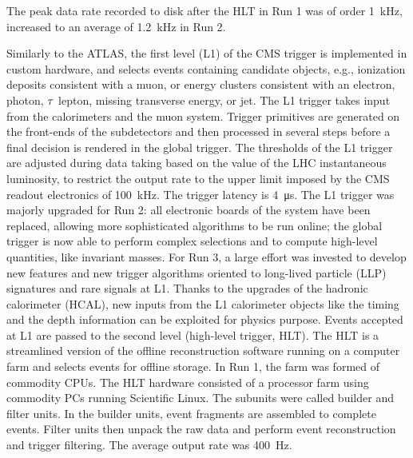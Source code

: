 The peak data rate recorded to disk after the HLT in Run 1 was of order \SI{1}{\kilo\hertz}, increased to an average of \SI{1.2}{\kilo\hertz} in Run 2.\\
\vspace{0.3 cm}

Similarly to the ATLAS, the first level (L1) of the CMS trigger is implemented in custom hardware, and selects events containing candidate objects, e.g., ionization deposits consistent with a muon, or energy clusters consistent with an electron, photon, $\rm \tau$ lepton, missing transverse energy, or jet. The L1 trigger takes input from the calorimeters and the muon system. 
Trigger primitives are generated on the front-ends of the subdetectors and then processed in several steps before a final decision is rendered in the global trigger.
The thresholds of the L1 trigger are adjusted during data taking based on the value of the LHC instantaneous luminosity, to restrict the output rate to the upper limit imposed by the CMS readout electronics of \SI{100}{\kilo\hertz}. The trigger latency is \SI{4}{\micro\second}.
The L1 trigger was majorly upgraded for Run 2: all electronic boards of the system have been replaced, allowing more sophisticated algorithms to be run online; the global trigger is now able to perform complex selections and to compute high-level quantities, like invariant masses.
For Run 3, a large effort was invested to develop new features and new trigger algorithms oriented to long-lived particle (LLP) signatures and rare signals at L1. Thanks to the upgrades of the hadronic calorimeter (HCAL), new inputs from the L1 calorimeter objects like the timing and the depth information can be exploited for physics purpose.
Events accepted at L1 are passed to the second level (high-level trigger, HLT).
The HLT is a streamlined version of the offline reconstruction software running on a computer farm and selects events for offline storage.
In Run 1, the farm was formed of commodity CPUs. The HLT hardware consisted of a processor farm using commodity PCs running Scientific Linux. 
The subunits were called builder and filter units. In the builder units, event fragments are assembled to complete events. Filter units then unpack the raw data and perform event reconstruction and trigger filtering. The average output rate was \SI{400}{\hertz}.
